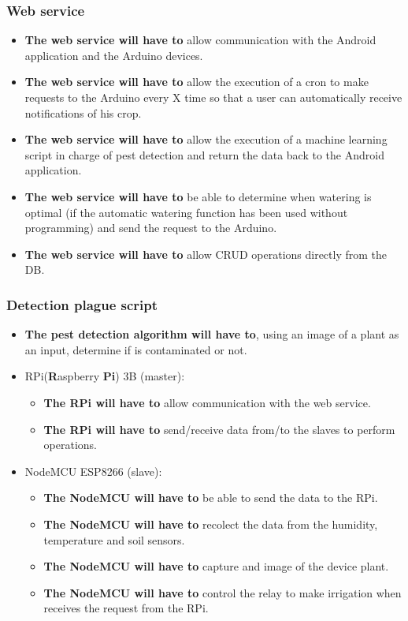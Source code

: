 \documentclass[11pt,a4paper]{article}
\begin{document}
\subsubsection{Web service}
\begin{itemize}
\item \textbf{The web service will have to} allow communication with the Android application and the Arduino devices.

\item \textbf{The web service will have to} allow the execution of a cron to make requests to the Arduino every X time so that a user can automatically receive notifications of his crop.

\item \textbf{The web service will have to} allow the execution of a machine learning script in charge of pest detection and return the data back to the Android application.

\item \textbf{The web service will have to} be able to determine when watering is optimal (if the automatic watering function has been used without programming) and send the request to the Arduino.

\item \textbf{The web service will have to} allow CRUD operations directly from the DB.
\end{itemize}

\subsubsection{Detection plague script}
\begin{itemize}
\item \textbf{The pest detection algorithm will have to}, using an image of a plant as an input, determine if is contaminated or not.
\end{itemize}

\begin{itemize}
\item RPi(\textbf{R}aspberry \textbf{Pi}) 3B (master):
	\begin{itemize}
	\item \textbf{The RPi will have to} allow communication with the web service.
	\item \textbf{The RPi will have to} send/receive data from/to the slaves to perform operations.
	\end{itemize}

\item NodeMCU ESP8266 (slave):
	\begin{itemize}
	\item \textbf{The NodeMCU will have to} be able to send the data to the RPi. 
	\item \textbf{The NodeMCU will have to} recolect the data from the humidity, temperature and soil sensors.
	\item \textbf{The NodeMCU will have to} capture and image of the device plant.		
	\item \textbf{The NodeMCU will have to} control the relay to make irrigation when receives the request from the RPi.
	\end{itemize}
\end{itemize}
\end{document}
